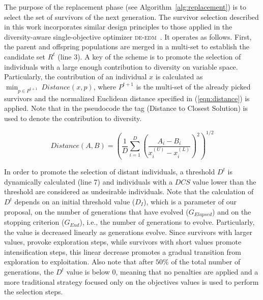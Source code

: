 The purpose of the replacement phase (see Algorithm~\ref{alg:replacement}) is to select the set of survivors of the next generation.
%
The survivor selection described in this work incorporates similar design principles to those applied in 
the diversity-aware single-objective optimizer \textsc{de-edm}~\cite{castillo2019differential}.
%
It operates as follows.
%
First, the parent and offspring populations are merged in a multi-set to establish the candidate set $R^t$ (line 3).
%
A key of the scheme is to promote the selection of individuals with a large enough contribution to diversity
on variable space.
%
Particularly, the contribution of an individual $x$ is calculated as $\displaystyle{\min_{p \in P^{t+1}}\ Distance(x, p)}$, 
where $P^{t+1}$ is the multi-set of the already picked survivors and the normalized Euclidean distance
specified in (\ref{eqn:distance}) is applied.
%
Note that in the pseudocode the tag \DCS{} (Distance to Closest Solution) is used to denote the contribution to diversity.

\begin{equation}\label{eqn:distance}
Distance(A, B) =   \left ( \frac{1}{D}  \sum_{i=1}^D \left ( \frac{A_i - B_i}{x_i^{(U)} - x_i^{(L)}} \right )^2  \right)^{1/2}
\end{equation}

In order to promote the selection of distant individuals, a threshold $D^t$ is dynamically calculated (line 7) and 
individuals with a $DCS$ value lower than the threshold are considered as undesirable individuals.
%
Note that the calculation of $D^t$ depends on an initial threshold value ($D_I$), which is a parameter of our proposal,
on the number of generations that have evolved ($G_{Elapsed}$) and on the stopping criterion ($G_{End}$), i.e., the number of
generations to evolve.
%
Particularly, the value is decreased linearly as generations evolve.
%
Since survivors with larger \DCS{} values, provoke exploration steps, while survivors with short \DCS{} values promote
intensification steps, this linear decrease promotes
a gradual transition from exploration to exploitation.
%
Also note that after $50\%$ of the total number of generations, the $D^t$ value is below 0, 
meaning that no penalties are applied and a more traditional strategy focused only on the objectives values
is used to perform the selection steps.

